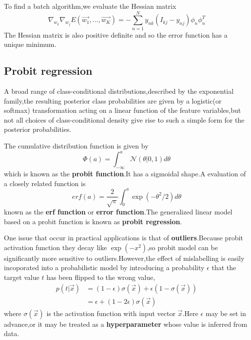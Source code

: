 To find a batch algorithm,we evaluate the Hessian matrix
\begin{equation}
\nabla_{w_k}\nabla_{w_j}E(\vec{w_1},...,\vec{w_K})
=-\sum_{n=1}^{N}y_{nk}(I_{kj}-y_{nj})\phi_n\phi_n^T
\end{equation}
The Hessian matrix is also positive definite and so the error function has a unique minimum.

\subsection{Probit regression}
A broad range of class-conditional distributions,described by the exponential family,the resulting posterior class probabilities are given by a logistic(or softmax) transformation acting on a linear function of the feature variables,but not all choices of class-conditional density give rise to such a simple form for the posterior probabilities.

The cumulative distribution function is given by
\begin{equation}
	\Phi(a) = \int_{-\infty}^{a}\mathcal{N}(\theta|0,1)d\theta
\end{equation}
which is known as the \textbf{probit function}.It has a sigmoidal shape.A evaluation of a closely related function is
\begin{equation}
erf(a) = \dfrac{2}{\sqrt{\pi}}\int_{0}^{a}\exp(-\theta^2/2)d\theta
\end{equation}
known as the \textbf{erf function} or \textbf{error function}.The generalized linear model based on a probit function is known as \textbf{probit regression}.

One issue that occur in practical applications is that of \textbf{outliers}.Because probit activation function they decay like $\exp(-x^2)$,so probit model can be significantly more sensitive to outliers.However,the effect of mislabelling is easily incoporated into a probabilistic model by introducing a probability $\epsilon$ that the target value $t$ has been flipped to the wrong value,
\begin{align}
p(t|\vec{x}) &= (1-\epsilon)\sigma(\vec{x})+\epsilon(1-\sigma(\vec{x}))\\
&=\epsilon + (1-2\epsilon)\sigma(\vec{x})
\end{align}
where $\sigma(\vec{x})$ is the activation function with input vector $\vec{x}$.Here $\epsilon$ may be set in advance,or it may be treated as a \textbf{hyperparameter} whose value is inferred from data.




